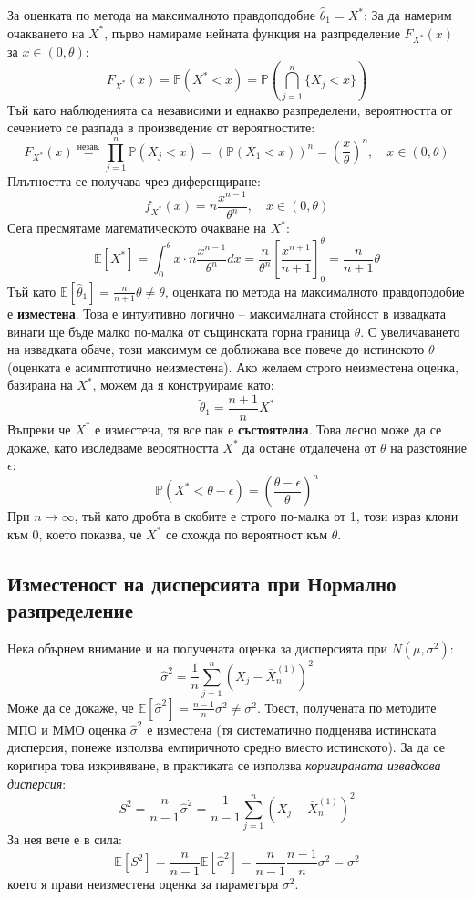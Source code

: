 \documentclass{article}
\begin{document}
За оценката по метода на максималното правдоподобие $\hat{\theta}_1 = X^*$:
За да намерим очакването на $X^*$, първо намираме нейната функция на разпределение $F_{X^*}(x)$ за $x \in (0, \theta)$:
\[
    F_{X^*}(x) = \mathbb{P}(X^* < x) = \mathbb{P}\left(\bigcap_{j=1}^n \{X_j < x\}\right)
\]
Тъй като наблюденията са независими и еднакво разпределени, вероятността от сечението се разпада в произведение от вероятностите:
\[
    F_{X^*}(x) \stackrel{\text{незав.}}{=} \prod_{j=1}^n \mathbb{P}(X_j < x) = \left( \mathbb{P}(X_1 < x) \right)^n = \left(\frac{x}{\theta}\right)^n, \quad x \in (0, \theta)
\]
Плътността се получава чрез диференциране:
\[
    f_{X^*}(x) = n \frac{x^{n-1}}{\theta^n}, \quad x \in (0, \theta)
\]
Сега пресмятаме математическото очакване на $X^*$:
\[
    \mathbb{E}[X^*] = \int_0^\theta x \cdot n \frac{x^{n-1}}{\theta^n} dx = \frac{n}{\theta^n} \left[ \frac{x^{n+1}}{n+1} \right]_0^\theta = \frac{n}{n+1} \theta
\]
Тъй като $\mathbb{E}[\hat{\theta}_1] = \frac{n}{n+1} \theta \neq \theta$, оценката по метода на максималното правдоподобие е \textbf{изместена}. Това е интуитивно логично -- максималната стойност в извадката винаги ще бъде малко по-малка от същинската горна граница $\theta$. С увеличаването на извадката обаче, този максимум се доближава все повече до истинското $\theta$ (оценката е асимптотично неизместена). Ако желаем строго неизместена оценка, базирана на $X^*$, можем да я конструираме като:
\[
    \tilde{\theta}_1 = \frac{n+1}{n} X^*
\]
Въпреки че $X^*$ е изместена, тя все пак е \textbf{състоятелна}. Това лесно може да се докаже, като изследваме вероятността $X^*$ да остане отдалечена от $\theta$ на разстояние $\epsilon$:
\[
    \mathbb{P}(X^* < \theta - \epsilon) = \left(\frac{\theta - \epsilon}{\theta}\right)^n
\]
При $n \to \infty$, тъй като дробта в скобите е строго по-малка от 1, този израз клони към 0, което показва, че $X^*$ се схожда по вероятност към $\theta$.

\subsection{Изместеност на дисперсията при Нормално разпределение}

Нека обърнем внимание и на получената оценка за дисперсията при $N(\mu, \sigma^2)$:
\[
    \hat{\sigma}^2 = \frac{1}{n} \sum_{j=1}^n \left(X_j - \bar{X}_n^{(1)}\right)^2
\]
Може да се докаже, че $\mathbb{E}[\hat{\sigma}^2] = \frac{n-1}{n} \sigma^2 \neq \sigma^2$. Тоест, получената по методите МПО и ММО оценка $\hat{\sigma}^2$ е изместена (тя систематично подценява истинската дисперсия, понеже използва емпиричното средно вместо истинското). За да се коригира това изкривяване, в практиката се използва \emph{коригираната извадкова дисперсия}:
\[
    S^2 = \frac{n}{n-1} \hat{\sigma}^2 = \frac{1}{n-1} \sum_{j=1}^{n} (X_j - \bar{X}_n^{(1)})^2
\]
За нея вече е в сила:
\[
    \mathbb{E}[S^2] = \frac{n}{n-1} \mathbb{E}[\hat{\sigma}^2] = \frac{n}{n-1} \frac{n-1}{n} \sigma^2 = \sigma^2
\]
което я прави неизместена оценка за параметъра $\sigma^2$.
\end{document}

